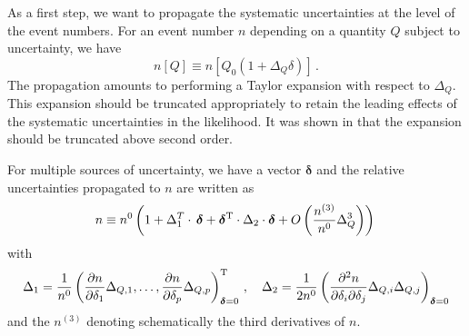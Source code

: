 \documentclass[11pt]{article}
\newcommand{\be}{\begin{equation}}
\newcommand{\ee}{\end{equation}}
\begin{document}
As a first step, we want to propagate the systematic uncertainties at the level of the event numbers.  For an event number $n$ depending on a quantity $Q$ subject to uncertainty, we have
\be n[Q]\equiv n[Q_0(1+\Delta_Q \delta)]\,.
\ee
The propagation amounts to performing a Taylor expansion with respect to $\Delta_Q $. This expansion should be truncated appropriately  to retain the leading effects of the systematic uncertainties in the likelihood. It was shown in \cite{Fichet:2016gvx} that  the expansion should be truncated above second order.

For multiple sources of uncertainty, we have a vector $\boldsymbol{\delta}$ and the relative uncertainties propagated to $n$ are written as
\be n\equiv n^{0}\left( 1+ \Delta_{1}^T\cdot \, \boldsymbol{\delta}+\boldsymbol{\delta}^{\rm T}\cdot\Delta_{2} \cdot \boldsymbol{\delta} +O\left(\frac{n^{(3)}}{n^{0}}\Delta_Q^3\right)
\right)\,
\label{eq:propmult}
\ee
with
\be
\Delta_1=\frac{1}{n^{0}}\left(\frac{\partial n }{\partial \delta_{1}}\Delta_{Q,1},\ldots,
\frac{ \partial n }{\partial \delta_{p}}\Delta_{Q,p} \right)_{\boldsymbol{\delta}=0}^{\rm T} \,, \label{eq:stdDelta1} \quad \Delta_2=\frac{1}{2n^{0}}\left(\frac{\partial^2 n}{\partial \delta_{i}\partial \delta_{j}}\Delta_{Q,i}\Delta_{Q,j}  \right)_{\boldsymbol{\delta}=0} 
\ee
and the $n^{(3)}$ denoting schematically the third derivatives of $n$.
\end{document}
